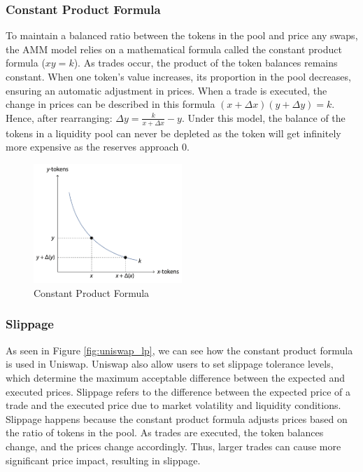 \subsubsection{Constant Product Formula}

To maintain a balanced ratio between the tokens in the pool and price any swaps, the AMM model relies on a mathematical formula called the constant product formula ($xy = k$). As trades occur, the product of the token balances remains constant. When one token's value increases, its proportion in the pool decreases, ensuring an automatic adjustment in prices. When a trade is executed, the change in prices can be described in this formula $(x + \Delta x)(y + \Delta y) = k$. Hence, after rearranging: $\Delta y = \frac{k}{x + \Delta x} - y$. Under this model, the balance of the tokens in a liquidity pool can never be depleted as the token will get infinitely more expensive as the reserves approach 0.

\begin{figure}[!htb]
    \centering
    \includegraphics[width=0.5\textwidth]{background/Images/constant_product_formula.png}
    \caption{Constant Product Formula~\cite{schar2021decentralized}}
\end{figure}

\subsubsection{Slippage}

As seen in Figure \ref{fig:uniswap_lp}, we can see how the constant product formula is used in Uniswap. Uniswap also allow users to set slippage tolerance levels, which determine the maximum acceptable difference between the expected and executed prices. Slippage refers to the difference between the expected price of a trade and the executed price due to market volatility and liquidity conditions. Slippage happens because the constant product formula adjusts prices based on the ratio of tokens in the pool. As trades are executed, the token balances change, and the prices change accordingly. Thus, larger trades can cause more significant price impact, resulting in slippage.

